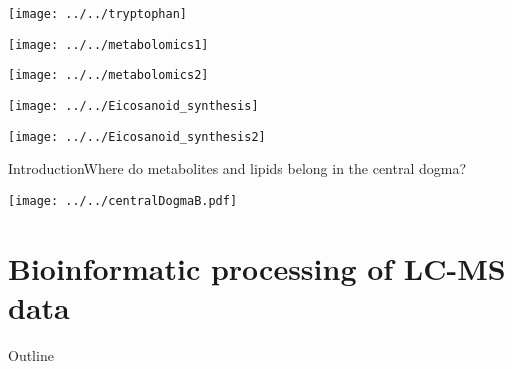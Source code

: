 \documentclass[xcolor=dvipsnames]{beamer}
\begin{document}
\begin{frame}
	\vspace{-10.5pt}
	\begin{center}
		\texttt{[image: ../../tryptophan]}
		
	\end{center}
\end{frame}

\begin{frame}
\begin{center}
	\texttt{[image: ../../metabolomics1]}
\end{center}
\end{frame}

\begin{frame}
\begin{center}
	\texttt{[image: ../../metabolomics2]}
\end{center}
\end{frame}

\begin{frame}
	\begin{center}
		\texttt{[image: ../../Eicosanoid\_synthesis]}
		
	\end{center}
\end{frame}

\begin{frame}
\begin{center}
	\texttt{[image: ../../Eicosanoid\_synthesis2]}
\end{center}
\end{frame}

\begin{frame}{Introduction}{Where do metabolites and lipids belong in the central dogma?}
\vspace{-7 pt}
\begin{center}
	\texttt{[image: ../../centralDogmaB.pdf]}
\end{center}
\end{frame}

\section{Bioinformatic processing of LC-MS data}
\begin{frame}{Outline}
\vspace{-10.5pt}
\tableofcontents[currentsection,subsectionstyle=hide]
\end{frame}
\end{document}
